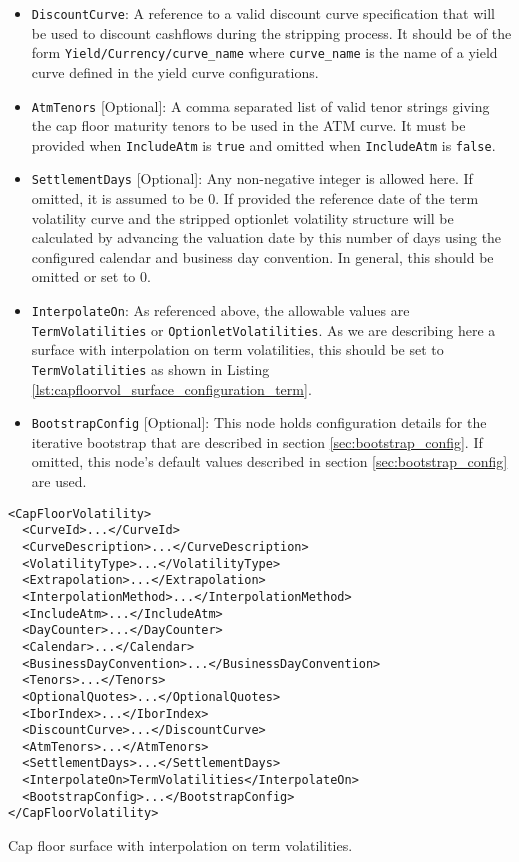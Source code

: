 \begin{itemize}
\item \lstinline!DiscountCurve!:
A reference to a valid discount curve specification that will be used to discount cashflows during the stripping process. It should be of the form \lstinline!Yield/Currency/curve_name! where \lstinline!curve_name! is the name of a yield curve defined in the yield curve configurations.

\item \lstinline!AtmTenors! [Optional]:
A comma separated list of valid tenor strings giving the cap floor maturity tenors to be used in the ATM curve. It must be provided when \lstinline!IncludeAtm! is \lstinline!true! and omitted when \lstinline!IncludeAtm! is \lstinline!false!.

\item \lstinline!SettlementDays! [Optional]:
Any non-negative integer is allowed here. If omitted, it is assumed to be 0. If provided the reference date of the term volatility curve and the stripped optionlet volatility structure will be calculated by advancing the valuation date by this number of days using the configured calendar and business day convention. In general, this should be omitted or set to 0.

\item \lstinline!InterpolateOn!:
As referenced above, the allowable values are \lstinline!TermVolatilities! or \lstinline!OptionletVolatilities!. As we are describing here a surface with interpolation on term volatilities, this should be set to \lstinline!TermVolatilities! as shown in Listing \ref{lst:capfloorvol_surface_configuration_term}.

\item \lstinline!BootstrapConfig! [Optional]:
This node holds configuration details for the iterative bootstrap that are described in section \ref{sec:bootstrap_config}. If omitted, this node's default values described in section \ref{sec:bootstrap_config} are used.

\end{itemize}

\begin{longlisting}
\begin{verbatim}
<CapFloorVolatility>
  <CurveId>...</CurveId>
  <CurveDescription>...</CurveDescription>
  <VolatilityType>...</VolatilityType>
  <Extrapolation>...</Extrapolation>
  <InterpolationMethod>...</InterpolationMethod>
  <IncludeAtm>...</IncludeAtm>
  <DayCounter>...</DayCounter>
  <Calendar>...</Calendar>
  <BusinessDayConvention>...</BusinessDayConvention>
  <Tenors>...</Tenors>
  <OptionalQuotes>...</OptionalQuotes>
  <IborIndex>...</IborIndex>
  <DiscountCurve>...</DiscountCurve>
  <AtmTenors>...</AtmTenors>
  <SettlementDays>...</SettlementDays>
  <InterpolateOn>TermVolatilities</InterpolateOn>
  <BootstrapConfig>...</BootstrapConfig>
</CapFloorVolatility>
\end{verbatim}
\caption{Cap floor surface with interpolation on term volatilities.}
\label{lst:capfloorvol_surface_configuration_term}
\end{longlisting}

